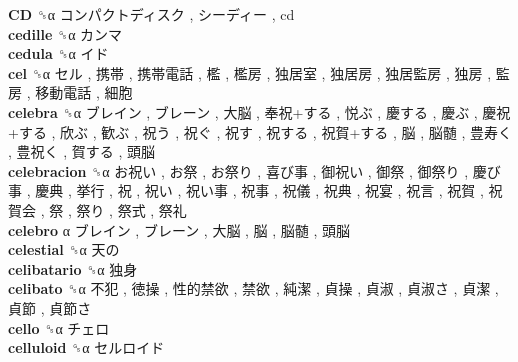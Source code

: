 \textbf{CD} ␝α   コンパクトディスク ,  シーディー , cd  \\
\textbf{cedille} ␝α   カンマ   \\
\textbf{cedula} ␝α   イド   \\
\textbf{cel} ␝α   セル ,  携帯 ,  携帯電話 ,  檻 ,  檻房 ,  独居室 ,  独居房 ,  独居監房 ,  独房 ,  監房 ,  移動電話 ,  細胞   \\
\textbf{celebra} ␝α   ブレイン ,  ブレーン ,  大脳 ,  奉祝+する ,  悦ぶ ,  慶する ,  慶ぶ ,  慶祝+する ,  欣ぶ ,  歓ぶ ,  祝う ,  祝ぐ ,  祝す ,  祝する ,  祝賀+する ,  脳 ,  脳髄 ,  豊寿く ,  豊祝く ,  賀する ,  頭脳   \\
\textbf{celebracion} ␝α   お祝い ,  お祭 ,  お祭り ,  喜び事 ,  御祝い ,  御祭 ,  御祭り ,  慶び事 ,  慶典 ,  挙行 ,  祝 ,  祝い ,  祝い事 ,  祝事 ,  祝儀 ,  祝典 ,  祝宴 ,  祝言 ,  祝賀 ,  祝賀会 ,  祭 ,  祭り ,  祭式 ,  祭礼   \\
\textbf{celebro} α   ブレイン ,  ブレーン ,  大脳 ,  脳 ,  脳髄 ,  頭脳   \\
\textbf{celestial} ␝α   天の   \\
\textbf{celibatario} ␝α   独身   \\
\textbf{celibato} ␝α   不犯 ,  徳操 ,  性的禁欲 ,  禁欲 ,  純潔 ,  貞操 ,  貞淑 ,  貞淑さ ,  貞潔 ,  貞節 ,  貞節さ   \\
\textbf{cello} ␝α   チェロ   \\
\textbf{celluloid} ␝α   セルロイド   \\
